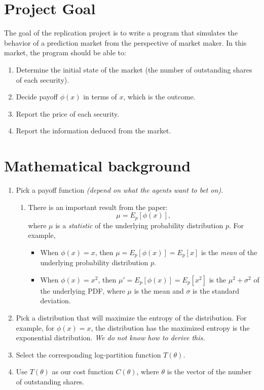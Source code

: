 \documentclass{article}
\begin{document}
\section{Project Goal}
The goal of the replication project is to write a program that simulates the behavior of a prediction market from the perspective of market maker. In this market, the program should be able to:
\begin{enumerate}
    \item Determine the initial state of the market (the number of outstanding shares of each security).
    \item Decide payoff $\phi(x)$ in terms of $x$, which is the outcome.
    \item Report the price of each security.
    \item Report the information deduced from the market.
\end{enumerate}
\section{Mathematical background}
\begin{enumerate}
    \item Pick a payoff function \emph{(depend on what the agents want to bet on)}.
    \begin{enumerate}
        \item There is an important result from the paper: $$\mu=E_p[\phi(x)],$$ where $\mu$ is a \emph{statistic} of the underlying probability distribution $p$. For example, 
        \begin{itemize}
            \item When $\phi(x)=x$, then $\mu=E_p[\phi(x)]=E_p[x]$ is the \emph{mean} of the underlying probability distribution $p$.
            \item When $\phi(x)=x^2$, then $\mu'=E_p[\phi(x)]=E_p[x^2]$ is the $\mu^2+\sigma^2$ of the underlying PDF, where $\mu$ is the mean and $\sigma$ is the standard deviation.
        \end{itemize}
    \end{enumerate}
    \item Pick a distribution that will maximize the entropy of the distribution. For example, for $\phi(x)=x$, the distribution has the maximized entropy is the exponential distribution. \emph{We do not know how to derive this.}
    \item Select the corresponding log-partition function $T(\theta)$.
    \item Use $T(\theta)$ as our cost function $C(\theta)$, where $\theta$ is the vector of the number of outstanding shares.
\end{enumerate}
\end{document}
